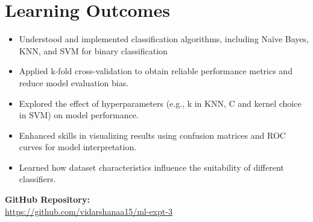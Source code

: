 \documentclass[11pt]{article}
\begin{document}
\vspace{3cm}
\section{Learning Outcomes}
\begin{itemize}
    \item Understood and implemented classification algorithms, including Naïve Bayes, KNN, and SVM for binary classification
    \item Applied k-fold cross-validation to obtain reliable performance metrics and reduce model evaluation bias.
    \item Explored the effect of hyperparameters (e.g., k in KNN, C and kernel choice in SVM) on model performance.
    \item Enhanced skills in visualizing results using confusion matrices and ROC curves for model interpretation.
    \item Learned how dataset characteristics influence the suitability of different classifiers.

\end{itemize}

\vspace{1cm}
\noindent
\textbf{GitHub Repository:} \\
\href{https://github.com/vidarshanaa15/ml-expt-3}{https://github.com/vidarshanaa15/ml-expt-3}
\end{document}
